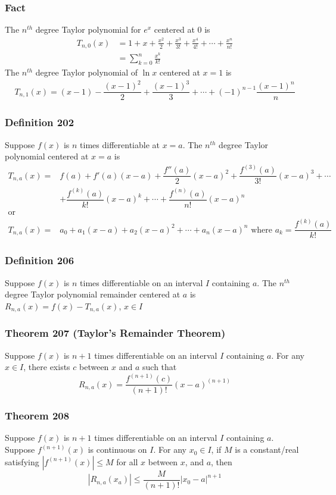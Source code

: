 \documentclass[12pt, letterpaper]{article}
\begin{document}
\subsubsection*{Fact}
The $n^{th}$ degree Taylor polynomial for $e^x$ centered at 0 is 
\begin{align*}
    T_{n,0}(x) &= 1 + x + \frac{x^2}{2} + \frac{x^3}{3!} + \frac{x^4}{4!} + \cdots + \frac{x^n}{n!} \\
               &= \sum_{k=0}^n \frac{x^k}{k!}
\end{align*}
The $n^{th}$ degree Taylor polynomial of $\ln x$ centered at $x=1$ is 
\begin{align*}
    T_{n,1}(x) = (x-1) - \dfrac{(x-1)^2}{2} + \dfrac{(x-1)^3}{3} + \cdots + (-1)^{n-1}\dfrac{(x-1)^n}{n}
\end{align*}
\subsubsection*{Definition 202}
Suppose $f(x)$ is $n$ times differentiable at $x=a$. The $n^{th}$ degree Taylor polynomial centered at $x=a$ is 
\begin{align*}
    T_{n,a}(x) = & f(a) + f'(a)(x-a) + \dfrac{f''(a)}{2}(x-a)^2 + \dfrac{f^(3)(a)}{3!}(x-a)^3 + \cdots \\
                 & + \dfrac{f^(k)(a)}{k!}(x-a)^k + \cdots + \dfrac{f^(n)(a)}{n!}(x-a)^n \\
    \text{or}\\
    T_{n,a}(x) = & a_0 + a_1(x-a) + a_2(x-a)^2 + \cdots + a_n(x-a)^n \text{ where } a_k = \dfrac{f^(k)(a)}{k!}
\end{align*}
\subsubsection*{Definition 206}
Suppose $f(x)$ is $n$ times differentiable on an interval $I$ containing $a$. The $n^{th}$ degree Taylor polynomial
remainder centered at $a$ is $R_{n,a}(x) = f(x) - T_{n,a}(x)$, $x \in I$
\subsubsection*{Theorem 207 (Taylor's Remainder Theorem)}
Suppose $f(x)$ is $n+1$ times differentiable on an interval $I$ containing $a$. For any $x \in I$, there
exists $c$ between $x$ and $a$ such that 
\[ R_{n,a}(x) = \dfrac{f^{(n+1)}(c)}{(n+1)!}(x-a)^{(n+1)} \]
\subsubsection*{Theorem 208}
Suppose $f(x)$ is $n+1$ times differentiable on an interval $I$ containing $a$. Suppose $f^(n+1)(x)$ is continuous on $I$. 
For any $x_0 \in I$, if $M$ is a constant/real satisfying $|f^(n+1)(x)| \leq M$ for all $x$ between $x$, and $a$, then 
\[ |R_{n,a}(x_a)| \leq \dfrac{M}{(n+1)!}|x_0 - a|^{n+1} \]
\end{document}
